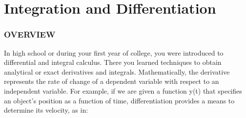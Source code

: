 \documentclass[../main.tex]{subfiles}
\begin{document}
\part{Integration and
Differentiation}


\section{OVERVIEW}

In high school or during your first year of college, you were introduced to differential and
integral calculus. There you learned techniques to obtain analytical or exact derivatives and
integrals.
Mathematically, the derivative represents the rate of change of a dependent variable
with respect to an independent variable. For example, if we are given a function y(t) that
specifies an object's position as a function of time, differentiation provides a means to determine its velocity, as in:







\blankpage
\end{document}
